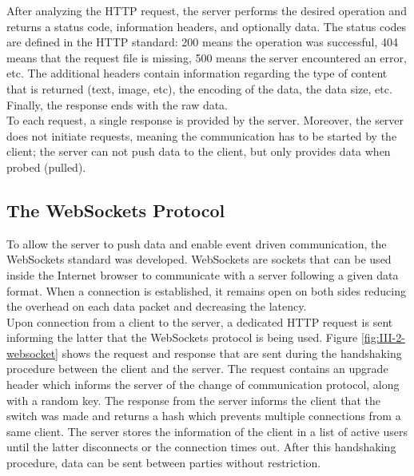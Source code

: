       After analyzing the HTTP request, the server performs the desired operation and returns a status code, information headers, and optionally data. The status codes are defined in the HTTP standard: 200 means the operation was successful, 404 means that the request file is missing, 500 means the server encountered an error, etc. The additional headers contain information regarding the type of content that is returned (text, image, etc), the encoding of the data, the data size, etc. Finally, the response ends with the raw data. \\

      To each request, a single response is provided by the server. Moreover, the server does not initiate requests, meaning the communication has to be started by the client; the server can not push data to the client, but only provides data when probed (pulled).

    \subsection{The WebSockets Protocol}

      To allow the server to push data and enable event driven communication, the WebSockets standard was developed. WebSockets are sockets that can be used inside the Internet browser to communicate with a server following a given data format. When a connection is established, it remains open on both sides reducing the overhead on each data packet and decreasing the latency. \\

      Upon connection from a client to the server, a dedicated HTTP request is sent informing the latter that the WebSockets protocol is being used. Figure \ref{fig:III-2-websocket} shows the request and response that are sent during the handshaking procedure between the client and the server. The request contains an upgrade header which informs the server of the change of communication protocol, along with a random key. The response from the server informs the client that the switch was made and returns a hash which prevents multiple connections from a same client. The server stores the information of the client in a list of active users until the latter disconnects or the connection times out. After this handshaking procedure, data can be sent between parties without restriction.

